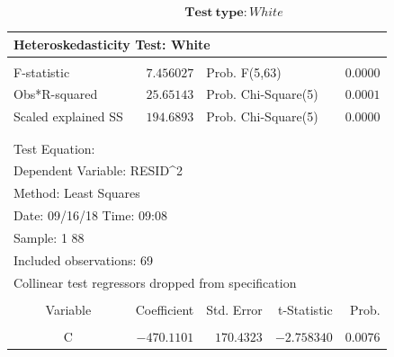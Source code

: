\documentclass[12pt]{report}
\begin{document}
\vspace{-\baselineskip}
$$\textbf{Test}\ \textbf{type}: White$$
\begin{table}[H]
	\centering
	\begin{tabular}{lrrrr}
		\multicolumn{3}{l}{Heteroskedasticity Test: White}&\multicolumn{1}{c}{}&\multicolumn{1}{c}{}\\
		[4.5pt] \hline \\ [-4.5pt]
		\multicolumn{1}{l}{F-statistic}&\multicolumn{1}{r}{$7.456027$}&\multicolumn{2}{l}{Prob. F(5,63)}&\multicolumn{1}{r}{$0.0000$}\\
		\multicolumn{1}{l}{Obs*R-squared}&\multicolumn{1}{r}{$25.65143$}&\multicolumn{2}{l}{Prob. Chi-Square(5)}&\multicolumn{1}{r}{$0.0001$}\\
		\multicolumn{1}{l}{Scaled explained SS}&\multicolumn{1}{r}{$194.6893$}&\multicolumn{2}{l}{Prob. Chi-Square(5)}&\multicolumn{1}{r}{$0.0000$}\\
		[4.5pt] \hline \\ [-4.5pt]
		\multicolumn{1}{c}{}&\multicolumn{1}{c}{}&\multicolumn{1}{c}{}&\multicolumn{1}{c}{}&\multicolumn{1}{c}{}\\
		\multicolumn{2}{l}{Test Equation:}&\multicolumn{1}{c}{}&\multicolumn{1}{c}{}&\multicolumn{1}{c}{}\\
		\multicolumn{3}{l}{Dependent Variable: RESID\textasciicircum 2}&\multicolumn{1}{c}{}&\multicolumn{1}{c}{}\\
		\multicolumn{3}{l}{Method: Least Squares}&\multicolumn{1}{c}{}&\multicolumn{1}{c}{}\\
		\multicolumn{3}{l}{Date: 09/16/18   Time: 09:08}&\multicolumn{1}{c}{}&\multicolumn{1}{c}{}\\
		\multicolumn{2}{l}{Sample: 1 88}&\multicolumn{1}{c}{}&\multicolumn{1}{c}{}&\multicolumn{1}{c}{}\\
		\multicolumn{3}{l}{Included observations: 69}&\multicolumn{1}{c}{}&\multicolumn{1}{c}{}\\
		\multicolumn{5}{l}{Collinear test regressors dropped from specification}\\
		[4.5pt] \hline \\ [-4.5pt]
		\multicolumn{1}{c}{Variable}&\multicolumn{1}{r}{Coefficient}&\multicolumn{1}{r}{Std. Error}&\multicolumn{1}{r}{t-Statistic}&\multicolumn{1}{r}{Prob.}\\
		[4.5pt] \hline \\ [-4.5pt]
		\multicolumn{1}{c}{C}&\multicolumn{1}{r}{$-470.1101$}&\multicolumn{1}{r}{$170.4323$}&\multicolumn{1}{r}{$-2.758340$}&\multicolumn{1}{r}{$0.0076$}\\

\end{tabular}
\end{table}
\end{document}
